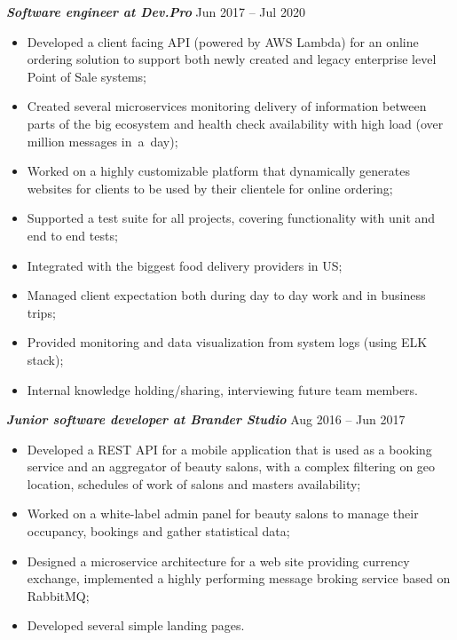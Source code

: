 \documentclass[margin, 10pt]{res} %
\begin{document}
\begin{resume}
{\sl \bf  Software engineer at Dev.Pro } \hfill Jun 2017 -- Jul 2020
\vspace{3px}
 \begin{itemize}
 \item Developed a client facing API (powered by AWS Lambda) for an online ordering solution to support both newly created and legacy enterprise level Point of Sale systems;
 \item Created several microservices monitoring delivery of information between parts of the big ecosystem and health check availability with high load (over million messages in~a~day);
 \item Worked on a highly customizable platform that dynamically generates websites for clients to be used by their clientele for online ordering;
 \item Supported a test suite for all projects, covering functionality with unit and end to end tests;
 \item Integrated with the biggest food delivery providers in US;
 \item Managed client expectation both during day to day work and in business trips;
 \item Provided monitoring and data visualization from system logs (using ELK stack);
 \item Internal knowledge holding/sharing, interviewing future team members.
\end{itemize}

{\sl \bf Junior software developer at Brander Studio} \hfill Aug 2016 -- Jun 2017
\vspace{3px}
\begin{itemize}
 \item Developed a REST API  for a mobile application that is used as a booking service and an aggregator of beauty salons, with a complex filtering on geo location, schedules of work of salons and masters availability;
 \item Worked on a white-label admin panel for beauty salons to manage their occupancy, bookings and gather statistical data;
 \item Designed a microservice architecture for a web site providing currency exchange, implemented a highly performing message broking service based on RabbitMQ;
 \item Developed several simple landing pages.
\end{itemize}


\end{resume}
\end{document}
